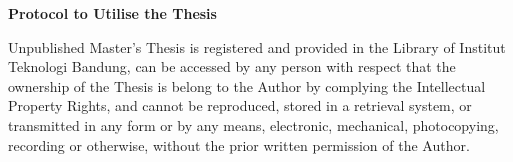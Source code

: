 \clearpage
{}
{}
\begin{center}
\textbf{\large Protocol to Utilise the Thesis}\\[0.5cm]
\end{center}

\noindent Unpublished Master's Thesis is registered and provided in the Library of Institut Teknologi Bandung, can be accessed by any person with respect that the ownership of the Thesis is belong to the Author by complying the Intellectual Property Rights, and cannot be reproduced, stored in a retrieval system, or transmitted in any form or by any means, electronic, mechanical, photocopying, recording or otherwise, without the prior written permission of the Author.
